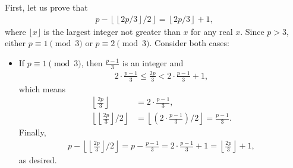 \documentclass{subfile}
\begin{document}
	\begin{solution}
		First, let us prove that
		\begin{align}\label{eq:primefloor}
		p - \left\lfloor \left\lfloor 2p/3\right\rfloor /2\right\rfloor = \left\lfloor 2p/3\right\rfloor + 1,
		\end{align}
		where $\lfloor x \rfloor$ is the largest integer not greater than $x$ for any real $x$. Since $p>3$, either $p \equiv 1 \pmod 3$ or $p \equiv 2 \pmod 3$. Consider both cases:
		\begin{itemize}
			\item If $p \equiv 1 \pmod 3$, then $\frac{p-1}{3}$ is an integer and
			\begin{align*}
			2\cdot\frac {p - 1}{3}\leq\frac {2p}{3} < 2\cdot\frac {p - 1}{3} + 1,
			\end{align*}
			which means
			\begin{align*}
			\left\lfloor\frac {2p}{3}\right\rfloor &= 2\cdot\frac {p - 1}{3},\\
			\left\lfloor\left\lfloor\frac {2p}{3}\right\rfloor /2\right\rfloor &= \left\lfloor\left(2\cdot\frac {p - 1}{3}\right)/2\right\rfloor = \frac {p - 1}{3}.
			\end{align*}
			Finally,
			\begin{align*}
			p - \left\lfloor\left\lfloor\frac {2p}{3}\right\rfloor /2\right\rfloor = p - \frac {p - 1}{3} = 2\cdot\frac {p - 1}{3} + 1 = \left\lfloor\frac {2p}{3}\right\rfloor + 1,
			\end{align*}
			as desired.
			

\end{itemize}
\end{solution}
\end{document}
